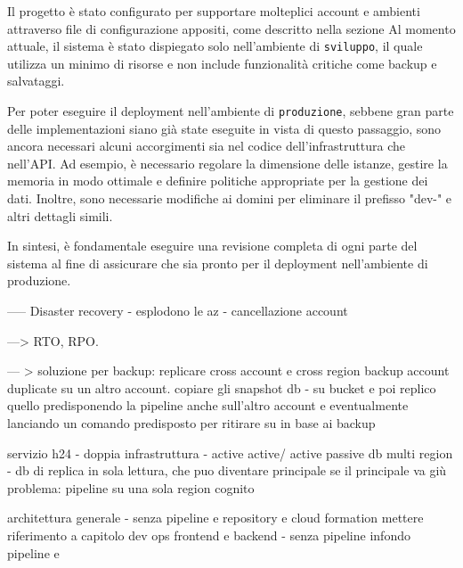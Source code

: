 Il progetto è stato configurato per supportare molteplici account e ambienti attraverso file di configurazione appositi, come descritto nella sezione %
Al momento attuale, il sistema è stato dispiegato solo nell'ambiente di \texttt{sviluppo}, il quale utilizza un minimo di risorse e non include funzionalità critiche come backup e salvataggi.

Per poter eseguire il deployment nell'ambiente di \texttt{produzione}, sebbene gran parte delle implementazioni siano già state eseguite in vista di questo passaggio, sono ancora necessari alcuni accorgimenti sia nel codice dell'infrastruttura che nell'API. Ad esempio, è necessario regolare la dimensione delle istanze, gestire la memoria in modo ottimale e definire politiche appropriate per la gestione dei dati. Inoltre, sono necessarie modifiche ai domini per eliminare il prefisso "dev-" e altri dettagli simili.

In sintesi, è fondamentale eseguire una revisione completa di ogni parte del sistema al fine di assicurare che sia pronto per il deployment nell'ambiente di produzione.



----- Disaster recovery
- esplodono le az
- cancellazione account

---> RTO, RPO.

--- > soluzione per backup: replicare cross account e cross region
        backup account duplicate su un altro account. copiare gli snapshot db - su bucket e poi replico quello
    predisponendo la pipeline anche sull'altro account e eventualmente lanciando un comando predisposto per ritirare su in base ai backup

servizio h24 - doppia infrastruttura - active active/ active passive
    db multi region - db di replica in sola lettura, che puo diventare principale se il principale va giù
    problema: pipeline su una sola region
    cognito 





architettura generale - senza pipeline e repository e cloud formation
    mettere riferimento a capitolo dev ops
frontend e backend - senza pipeline
infondo pipeline e 
